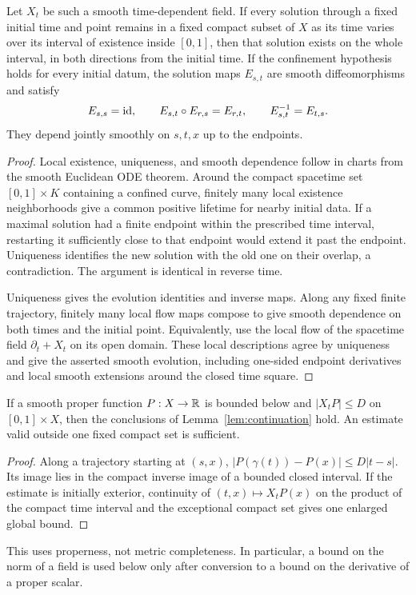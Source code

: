 \begin{lemma}\label{lem:continuation}
Let $X_t$ be such a smooth time-dependent field. If every solution
through a fixed initial time and point remains in a fixed compact
subset of $X$ as its time varies over its interval of existence
inside $[0,1]$, then that solution exists on the whole interval,
in both directions from the initial time.
If the confinement hypothesis holds for every initial datum,
the solution maps $E_{s,t}$ are smooth diffeomorphisms and satisfy
\[
 E_{s,s}=\mathrm{id},\qquad
 E_{s,t}\circ E_{r,s}=E_{r,t},\qquad
 E_{s,t}^{-1}=E_{t,s}.
\]
They depend jointly smoothly on $s,t,x$ up to the endpoints.
\end{lemma}
\begin{proof}
Local existence, uniqueness, and smooth dependence follow in charts
from the smooth Euclidean ODE theorem. Around the compact spacetime
set $[0,1]\times K$ containing a confined curve, finitely many
local existence neighborhoods give a common positive lifetime
for nearby initial data.
If a maximal solution had a finite endpoint within the prescribed
time interval, restarting it sufficiently close to that endpoint
would extend it past the endpoint. Uniqueness identifies the new
solution with the old one on their overlap, a contradiction.
The argument is identical in reverse time.

Uniqueness gives the evolution identities and inverse maps.
Along any fixed finite trajectory, finitely many local flow maps
compose to give smooth dependence on both times and the initial
point. Equivalently, use the local flow of the spacetime field
$\partial_t+X_t$ on its open domain.
These local descriptions agree by uniqueness and give the asserted
smooth evolution, including one-sided endpoint derivatives and
local smooth extensions around the closed time square.
\end{proof}

\begin{corollary}\label{cor:scalar}
If a smooth proper function $P:X\to\mathbb R$ is bounded below and
$|X_tP|\le D$ on $[0,1]\times X$, then the conclusions of
Lemma~\ref{lem:continuation} hold.
An estimate valid outside one fixed compact set is sufficient.
\end{corollary}
\begin{proof}
Along a trajectory starting at $(s,x)$,
$|P(\gamma(t))-P(x)|\le D|t-s|$.
Its image lies in the compact inverse image of a bounded closed
interval. If the estimate is initially exterior, continuity of
$(t,x)\mapsto X_tP(x)$ on the product of the compact time interval
and the exceptional compact set gives one enlarged global bound.
\end{proof}
This uses properness, not metric completeness. In particular, a
bound on the norm of a field is used below only after conversion
to a bound on the derivative of a proper scalar.

